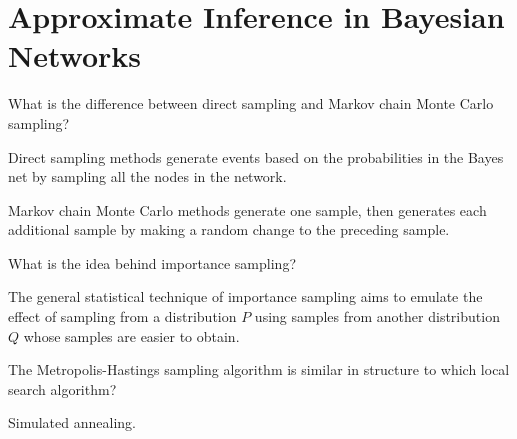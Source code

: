 \section{Approximate Inference in Bayesian Networks}

\begin{questions}

\question What is the difference between direct sampling and Markov chain Monte Carlo sampling?

\ifprintanswers
Direct sampling methods generate events based on the probabilities in the Bayes net by sampling all the nodes in the network.

Markov chain Monte Carlo methods generate one sample, then generates each additional sample by making a random change to the preceding sample.
\else
\vspace{1in}
\fi

\question  What is the idea behind importance sampling?

\ifprintanswers
The general statistical technique of importance sampling aims to emulate the effect of sampling
from a distribution $P$ using samples from another distribution $Q$ whose samples are easier to obtain.
\else
\vspace{.5in}
\fi

\question The Metropolis-Hastings sampling algorithm is similar in structure to which local search algorithm?

\ifprintanswers
Simulated annealing.
\else
\vspace{.25in}
\fi


\end{questions}


